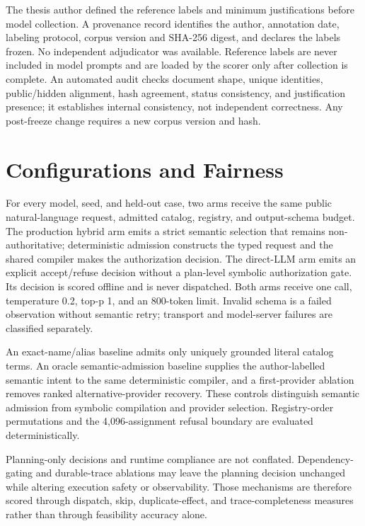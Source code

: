 The thesis author defined the reference labels and minimum justifications before model collection. A provenance record identifies the author, annotation date, labeling protocol, corpus version and SHA-256 digest, and declares the labels frozen. No independent adjudicator was available. Reference labels are never included in model prompts and are loaded by the scorer only after collection is complete. An automated audit checks document shape, unique identities, public/hidden alignment, hash agreement, status consistency, and justification presence; it establishes internal consistency, not independent correctness. Any post-freeze change requires a new corpus version and hash.

\section{Configurations and Fairness}

For every model, seed, and held-out case, two arms receive the same public natural-language request, admitted catalog, registry, and output-schema budget. The production hybrid arm emits a strict semantic selection that remains non-authoritative; deterministic admission constructs the typed request and the shared compiler makes the authorization decision. The direct-LLM arm emits an explicit accept/refuse decision without a plan-level symbolic authorization gate. Its decision is scored offline and is never dispatched. Both arms receive one call, temperature 0.2, top-p 1, and an 800-token limit. Invalid schema is a failed observation without semantic retry; transport and model-server failures are classified separately.

An exact-name/alias baseline admits only uniquely grounded literal catalog terms. An oracle semantic-admission baseline supplies the author-labelled semantic intent to the same deterministic compiler, and a first-provider ablation removes ranked alternative-provider recovery. These controls distinguish semantic admission from symbolic compilation and provider selection. Registry-order permutations and the 4,096-assignment refusal boundary are evaluated deterministically.

Planning-only decisions and runtime compliance are not conflated. Dependency-gating and durable-trace ablations may leave the planning decision unchanged while altering execution safety or observability. Those mechanisms are therefore scored through dispatch, skip, duplicate-effect, and trace-completeness measures rather than through feasibility accuracy alone.

